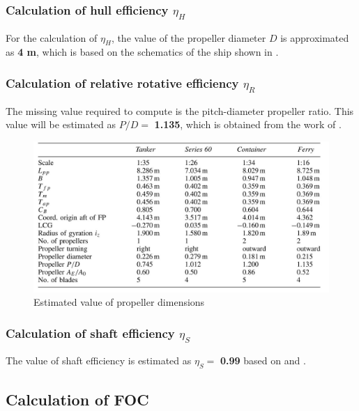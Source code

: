 \subsubsection*{Calculation of hull efficiency $\eta_H$}

For the calculation of $\eta_H$, the value of the propeller diameter $D$ is approximated as \textbf{4 m}, which is based on the schematics of the ship shown in .

\subsubsection*{Calculation of relative rotative efficiency $\eta_R$}

The missing value required to compute  is the pitch-diameter propeller ratio. This value will be estimated as $P/D =$ \textbf{1.135}, which is obtained from the work of .

\begin{figure}[h]
    \centering
        \includegraphics[width=.95\textwidth]{02_figures/betram_wolff_ratiomodel .jpg}
        \caption{Estimated value of propeller dimensions }
        \label{fig:betram_wolff_propellerdimensions}
\end{figure}

\subsubsection*{Calculation of shaft efficiency $\eta_S$}

The value of shaft efficiency is estimated as $\eta_S =$ \textbf{0.99} based on  and .

\subsection{Calculation of FOC}\label{sec:FOC_calc_method}


